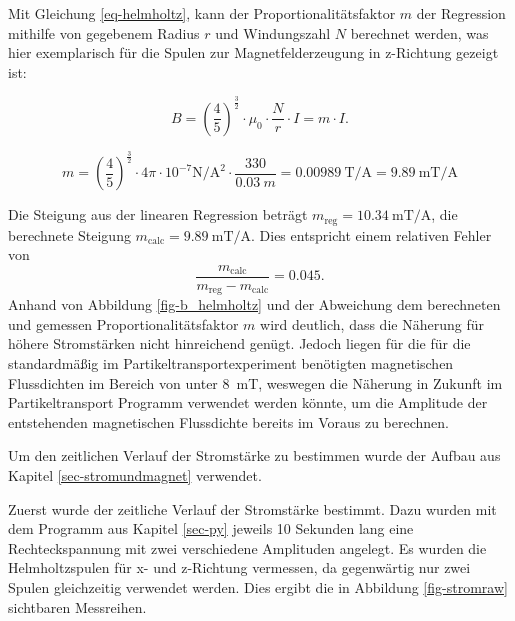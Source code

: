 \documentclass[page,pdftex,12pt,a4paper,twoside,openright]{scrbook}
\begin{document}
Mit Gleichung \ref{eq-helmholtz}, kann der Proportionalitätsfaktor \(m\) der Regression mithilfe von gegebenem Radius \(r\) und Windungszahl \(N\) berechnet werden, was hier exemplarisch für die Spulen zur Magnetfelderzeugung in z-Richtung gezeigt ist:

\begin{equation}
B = \left(\frac{4}{5}\right)^{\frac{3}{2}} \cdot \mu_{\mathrm{0}} \cdot \frac{N}{r} \cdot I = m \cdot I.
\end{equation}

\begin{equation}
m = \left(\frac{4}{5}\right)^{\frac{3}{2}} \cdot 4\pi \cdot 10^{-7}\si{\newton\per\square\ampere} \cdot \frac{330}{\SI{0.03}{m}} = \SI{0.00989}{\tesla\per\ampere} = \SI{9.89}{\milli\tesla\per\ampere}
\end{equation}

Die Steigung aus der linearen Regression beträgt \(m_\mathrm{reg} = \SI{10.34}{\milli\tesla\per\ampere}\), die berechnete Steigung \(m_\mathrm{calc} = \SI{9.89}{\milli\tesla\per\ampere}\). Dies entspricht einem relativen Fehler von $$ \frac{m_\mathrm{calc}}{m_\mathrm{reg} -m_\mathrm{calc}} = 0.045 .$$
Anhand von Abbildung \ref{fig-b_helmholtz} und der Abweichung dem berechneten und gemessen Proportionalitätsfaktor \(m\) wird deutlich, dass die Näherung für höhere Stromstärken nicht hinreichend genügt. Jedoch liegen für die für die standardmäßig im Partikeltransportexperiment benötigten magnetischen Flussdichten im Bereich von unter \SI{8}{\milli\tesla}, weswegen die Näherung in Zukunft im Partikeltransport Programm verwendet werden könnte, um die Amplitude der entstehenden magnetischen Flussdichte bereits im Voraus zu berechnen.

Um den zeitlichen Verlauf der Stromstärke zu bestimmen wurde der Aufbau aus Kapitel \ref{sec-stromundmagnet} verwendet.

Zuerst wurde der zeitliche Verlauf der Stromstärke bestimmt. Dazu wurden mit dem Programm aus Kapitel \ref{sec-py} jeweils 10 Sekunden lang eine Rechteckspannung mit zwei verschiedene Amplituden angelegt. Es wurden die Helmholtzspulen für x- und z-Richtung vermessen, da gegenwärtig nur zwei Spulen gleichzeitig verwendet werden. Dies ergibt die in Abbildung \ref{fig-stromraw} sichtbaren Messreihen.
\end{document}
